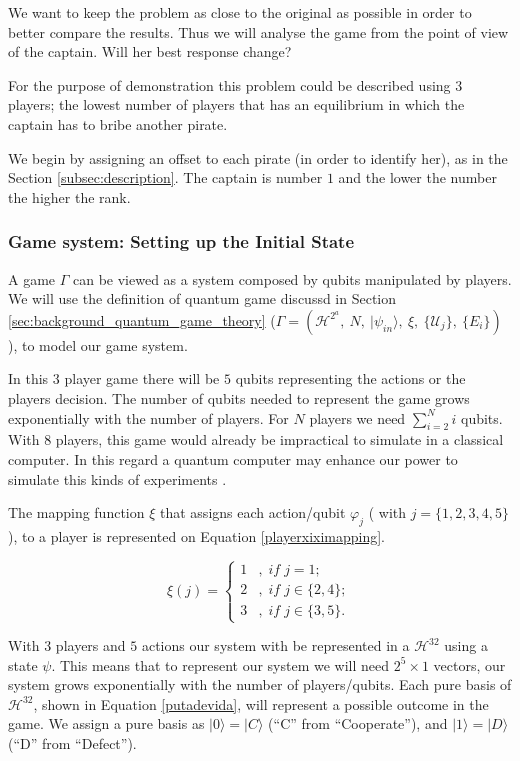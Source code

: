 We want to keep the problem as close to the original as possible in order to better compare the results. Thus we will analyse the game from the point of view of the captain. Will her best response change?

For the purpose of demonstration this problem could be described using $3$ players; the lowest number of players that has an equilibrium in which the captain has to bribe another pirate. 

We begin by assigning an offset to each pirate (in order to identify her), as in the Section \ref{subsec:description}. The captain is number $1$ and the lower the number the higher the rank. 



\subsubsection{Game system: Setting up the Initial State}
\label{subsec:pirates_initialstate}

A game $\Gamma$ can be viewed as a system composed by qubits manipulated by players. We will use the definition of quantum game discussd in Section \ref{sec:background_quantum_game_theory} ($\Gamma=(\mathcal{H}^{2^{a}},\: N,\:\vert\psi_{in}\rangle,\:\xi,\:\{\mathcal{U}_{j}\},\:\{E_{i}\})
$), to model our game system. 


In this $3$ player game there will be $5$ qubits representing the actions or the players decision. 
The number of qubits needed to represent the game grows exponentially with the number of players. For $N$ players we need $\sum_{i=2}^{N}{i}$ qubits. With 8 players, this game would already be impractical to simulate in a classical computer. In this regard a quantum computer may enhance our power to simulate this kinds of experiments \cite{Rieffel2011}.

The mapping function $\xi$ that assigns each action/qubit $\varphi_{j}$ ( with $j=\{ 1, 2, 3, 4, 5\}$), to a player is represented on Equation \ref{playerxiximapping}. 

\begin{equation}
\xi(j)=\begin{cases}
1 & ,\; if\; j=1;\\
2 & ,\; if\; j\in\{2,4\};\\
3 & ,\; if\; j\in\{3,5\}.
\end{cases}
\label{playerxiximapping}
\end{equation}


With $3$ players and $5$ actions our system with be represented in a $\mathcal{H}^{32}$ using a state $\psi$. This means that to represent our system we will need $2^{5}\times 1$ vectors, our system grows exponentially with the number of players/qubits. Each pure basis  of $\mathcal{H}^{32}$, shown in Equation \ref{putadevida}, will represent a possible outcome in the game. We assign a pure basis as $\vert 0\rangle = \vert C\rangle$ (``C'' from ``Cooperate''), and $\vert 1\rangle = \vert D\rangle$ (``D'' from ``Defect'').


